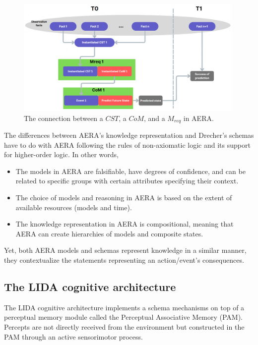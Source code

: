\documentclass[runningheads]{llncs}
\begin{document}
\begin{figure}
	\centering
	\includegraphics[width=0.99\textwidth]{AERAblockdiagram.png}
	\caption{ The connection between a $CST$, a $CoM$, and a $M_{req}$ in AERA. } 
	\label{fig:AERA}
\end{figure}

The differences between AERA’s knowledge representation and Drecher’s schemas have to do with AERA following the rules of non-axiomatic logic and its support for higher-order logic. In other words,
\begin{itemize}
    \item The models in AERA are falsifiable, have degrees of confidence, and can be related to specific groups with certain attributes specifying their context.
    \item The choice of models and reasoning in AERA is based on the extent of available resources (models and time).
    \item The knowledge representation in AERA is compositional, meaning that AERA can create hierarchies of models and composite states.
\end{itemize}

Yet, both AERA models and schemas represent knowledge in a similar manner, they contextualize the statements representing an action/event's consequences. 


\subsection{The LIDA cognitive architecture}

The LIDA cognitive architecture \cite{kugele_learning_2021}  implements a schema mechanisms on top of a perceptual memory module called the Perceptual Associative Memory (PAM). Percepts are not directly received from the environment but constructed in the PAM through an active sensorimotor process. 
\end{document}
